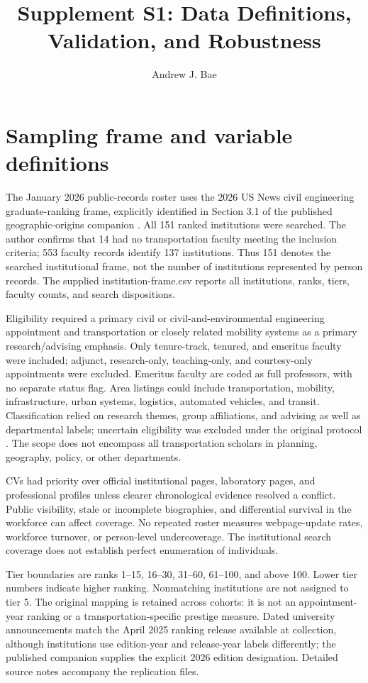 \documentclass[11pt]{article}
\title{Supplement S1: Data Definitions, Validation, and Robustness}
\author{Andrew J. Bae}\date{}
\begin{document}
\maketitle
\section{Sampling frame and variable definitions}\label{sec:scope}
The January 2026 public-records roster uses the 2026 US News civil engineering graduate-ranking frame, explicitly identified in Section 3.1 of the published geographic-origins companion \citep{bae2026a}. All 151 ranked institutions were searched. The author confirms that 14 had no transportation faculty meeting the inclusion criteria; 553 faculty records identify 137 institutions. Thus 151 denotes the searched institutional frame, not the number of institutions represented by person records. The supplied institution-frame.csv reports all institutions, ranks, tiers, faculty counts, and search dispositions.

Eligibility required a primary civil or civil-and-environmental engineering appointment and transportation or closely related mobility systems as a primary research/advising emphasis. Only tenure-track, tenured, and emeritus faculty were included; adjunct, research-only, teaching-only, and courtesy-only appointments were excluded. Emeritus faculty are coded as full professors, with no separate status flag. Area listings could include transportation, mobility, infrastructure, urban systems, logistics, automated vehicles, and transit. Classification relied on research themes, group affiliations, and advising as well as departmental labels; uncertain eligibility was excluded under the original protocol \citep{bae2026b}. The scope does not encompass all transportation scholars in planning, geography, policy, or other departments.

CVs had priority over official institutional pages, laboratory pages, and professional profiles unless clearer chronological evidence resolved a conflict. Public visibility, stale or incomplete biographies, and differential survival in the workforce can affect coverage. No repeated roster measures webpage-update rates, workforce turnover, or person-level undercoverage. The institutional search coverage does not establish perfect enumeration of individuals.

Tier boundaries are ranks 1--15, 16--30, 31--60, 61--100, and above 100. Lower tier numbers indicate higher ranking. Nonmatching institutions are not assigned to tier 5. The original mapping is retained across cohorts: it is not an appointment-year ranking or a transportation-specific prestige measure. Dated university announcements match the April 2025 ranking release available at collection, although institutions use edition-year and release-year labels differently; the published companion supplies the explicit 2026 edition designation. Detailed source notes accompany the replication files.
\end{document}

